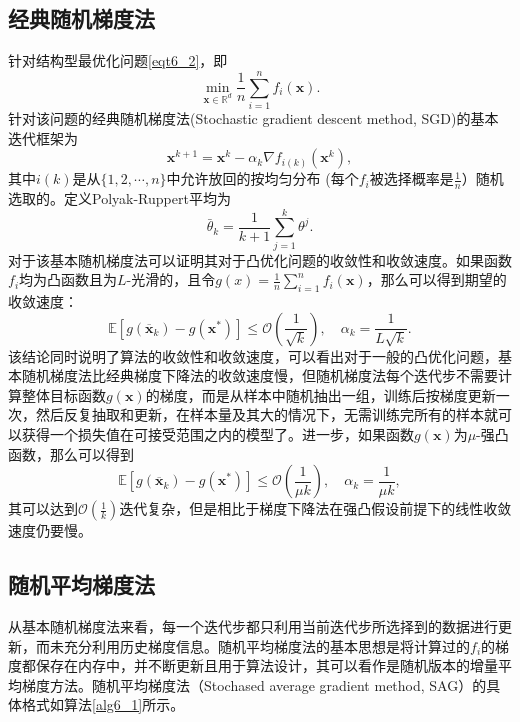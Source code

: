 \subsection{经典随机梯度法}
针对结构型最优化问题\ref{eqt6_2}，即
\begin{equation}
    \min _{\bm{x} \in \mathbb{R}^{d}} \frac{1}{n} \sum_{i=1}^{n} f_{i}(\bm{x}) .
    \nonumber
\end{equation}
针对该问题的经典随机梯度法(Stochastic gradient descent method, SGD)\cite{SGD}的基本迭代框架为
\begin{equation}
    \bm{x}^{k+1}=\bm{x}^{k}-\alpha_{k} \nabla f_{i(k)}\left(\bm{x}^{k}\right),
    \label{eqt6_3}
\end{equation}
其中$i(k)$是从$\{1, 2, \cdots, n\}$中允许放回的按均匀分布 (每个$f_{i}$被选择概率是$\frac{1}{n}$）随机选取的。定义Polyak-Ruppert平均\cite{2021Statistical}为
\begin{equation}
    \bar{\theta}_{k}=\frac{1}{k+1} \sum_{j=1}^{k} \theta^{j} .
    \label{eqt6_4}
\end{equation}
对于该基本随机梯度法可以证明其对于凸优化问题的收敛性和收敛速度。如果函数$f_{i}$均为凸函数且为$L$-光滑的，且令$g(x)=\frac{1}{n} \sum_{i=1}^{n} f_{i}(\bm{x})$，那么可以得到期望的收敛速度：
\begin{equation}
    \mathbb{E}\left[g\left(\overline{\bm{x}}_{k}\right)-g\left(\bm{x}^{*}\right)\right] \leq \mathcal{O}\left(\frac{1}{\sqrt{k}}\right), \quad \alpha_{k}=\frac{1}{L \sqrt{k}} .
    \label{eqt6_5}
\end{equation}
该结论同时说明了算法的收敛性和收敛速度\cite{SGD}，可以看出对于一般的凸优化问题，基本随机梯度法比经典梯度下降法的收敛速度慢，但随机梯度法每个迭代步不需要计算整体目标函数$g(\bm{x})$的梯度，而是从样本中随机抽出一组，训练后按梯度更新一次，然后反复抽取和更新，在样本量及其大的情况下，无需训练完所有的样本就可以获得一个损失值在可接受范围之内的模型了。进一步，如果函数$g(\bm{x})$为$\mu$-强凸函数，那么可以得到
\begin{equation}
    \mathbb{E}\left[g\left(\overline{\bm{x}}_{k}\right)-g\left(\bm{x}^{*}\right)\right] \leq \mathcal{O}\left(\frac{1}{\mu k}\right), \quad \alpha_{k}=\frac{1}{\mu k} ,
    \label{eqt6_6}
\end{equation}
其可以达到$\mathcal{O}(\frac{1}{k})$迭代复杂，但是相比于梯度下降法在强凸假设前提下的线性收敛速度仍要慢。

\subsection{随机平均梯度法}
从基本随机梯度法来看，每一个迭代步都只利用当前迭代步所选择到的数据进行更新，而未充分利用历史梯度信息。随机平均梯度法的基本思想是将计算过的$f_i$的梯度都保存在内存中，并不断更新且用于算法设计，其可以看作是随机版本的增量平均梯度方法。随机平均梯度法（Stochased average gradient method, SAG）\cite{SAG}的具体格式如算法\ref{alg6_1}所示。

